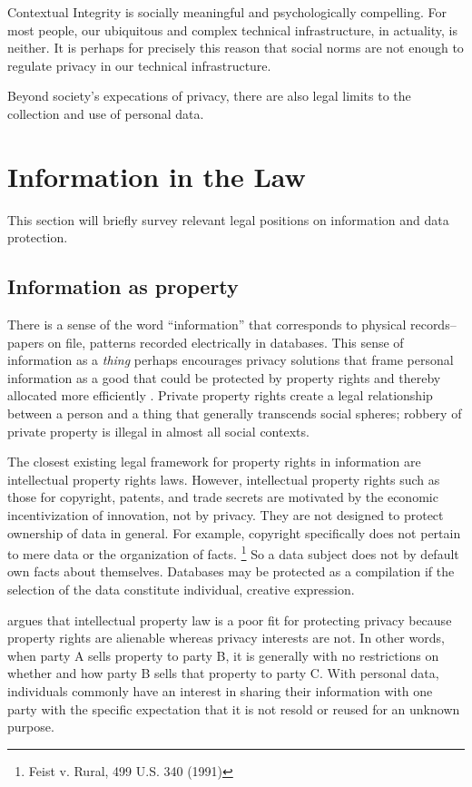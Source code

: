 \documentclass[../thesis.tex]{subfiles}
\begin{document}
Contextual Integrity is socially meaningful and
psychologically compelling.
For most people, our ubiquitous and complex
technical infrastructure, in actuality, is neither.
It is perhaps for precisely this reason that social
norms are not enough to regulate privacy in our
technical infrastructure.

Beyond society's expecations of privacy, there
are also legal limits to the collection and use
of personal data.




\section{Information in the Law}
\label{sec:law}

This section will briefly survey relevant
legal positions on information and data protection.

\subsection{Information as property}

There is a sense of the word ``information'' that
corresponds to physical records--papers on file,
patterns recorded electrically in databases.
This sense of information as a \emph{thing}
\citep{buckland1991information}
perhaps encourages
privacy solutions that frame personal information as a
good that could be protected by property rights and
thereby allocated more efficiently 
\citep{murphy1995property}.
Private property rights create a legal relationship between
a person and a thing that generally transcends
social spheres; robbery of private property is illegal
in almost all social contexts.

The closest existing legal framework for property rights
in information are intellectual property rights laws.
However, intellectual property rights such as those
for copyright, patents, and trade secrets are motivated
by the economic incentivization of innovation, not
by privacy.
They are not designed to protect ownership of data
in general.
For example, copyright specifically does
not pertain to mere data or the organization
of facts. \footnote{Feist v. Rural, 499 U.S. 340 (1991)}
So a data subject does not by default own facts
about themselves.
Databases may be protected as a compilation if
the selection of the data constitute individual,
creative expression.

\citet{samuelson2000privacy} argues that intellectual
property law is a poor fit for protecting privacy because
property rights are alienable whereas privacy interests
are not.
In other words, when party A sells property to party B,
it is generally with no restrictions on whether and how
party B sells that property to party C.
With personal data, individuals commonly have an interest
in sharing their information with one party with the
specific expectation that it is not resold or reused
for an unknown purpose.
\end{document}
